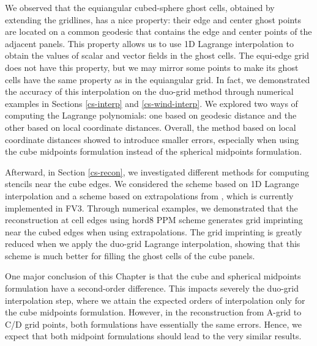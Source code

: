 We observed that the equiangular cubed-sphere ghost cells, obtained by extending the gridlines, has a nice property:
their edge and center ghost points are located on a common geodesic that contains the edge and center points of the adjacent panels. 
This property allows us to use 1D Lagrange interpolation to obtain the values of scalar and vector fields in the ghost cells.
The equi-edge grid does not have this property, but we may mirror some points to make its ghost cells have the same property as in the equiangular grid.
In fact, we demonstrated the accuracy of this interpolation on the duo-grid method through numerical examples in Sections \ref{cs-interp} and \ref{cs-wind-interp}.
We explored two ways of computing the Lagrange polynomials: one based on geodesic distance and the other based on local coordinate distances.
Overall, the method based on local coordinate distances showed to introduce smaller errors,
especially when using the cube midpoints formulation instead of the spherical midpoints formulation.

Afterward, in Section \ref{cs-recon}, we investigated different methods for computing stencils near the cube edges.
We considered the scheme based on 1D Lagrange interpolation and a scheme based on extrapolations from \citet{putman:2007}, which is currently implemented in FV3.
Through numerical examples, we demonstrated that the reconstruction at cell edges using hord8 PPM scheme generates grid imprinting near
the cubed edges when using extrapolations.
The grid imprinting is greatly reduced when we apply the duo-grid Lagrange interpolation,
showing that this scheme is much better for filling the ghost cells of the cube panels.

One major conclusion of this Chapter is that the cube and spherical midpoints formulation have a second-order difference.
This impacts severely the duo-grid interpolation step, where we attain the expected orders of interpolation only for the cube midpoints formulation.
However, in the reconstruction from A-grid to C/D grid points, both formulations have essentially the same errors.
Hence, we expect that both midpoint formulations should lead to the very similar results.


